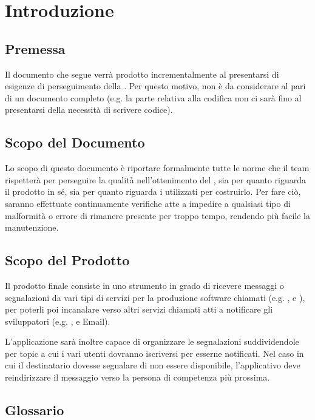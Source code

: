 \section{Introduzione}\label{Introduzione}

    \subsection{Premessa}
    Il documento che segue verrà prodotto incrementalmente al presentarsi di esigenze di perseguimento della .
    Per questo motivo, non è da considerare al pari di un documento completo (e.g. la parte relativa alla codifica non ci sarà fino
    al presentarsi della necessità di scrivere codice).

    \subsection{Scopo del Documento}
    Lo scopo di questo documento è riportare formalmente tutte le norme che il team \gruppo rispetterà per perseguire
    la qualità nell'ottenimento del , sia per quanto riguarda il prodotto in s\'e, sia per quanto riguarda i 
    utilizzati per costruirlo. Per fare ciò, saranno effettuate continuamente verifiche atte a impedire a qualsiasi tipo di malformità o errore
    di rimanere presente per troppo tempo, rendendo più facile la manutenzione.

    \subsection{Scopo del Prodotto}
    Il prodotto finale consiste in uno strumento in grado di ricevere messaggi o segnalazioni da vari tipi di servizi per la produzione software chiamati  (e.g. ,  e ), per poterli poi incanalare verso altri servizi chiamati  atti a notificare gli sviluppatori (e.g. ,  e Email).
    
    L'applicazione sarà inoltre capace di organizzare le segnalazioni suddividendole per topic a cui i vari utenti dovranno iscriversi per esserne notificati. Nel caso in cui il destinatario dovesse segnalare di non essere disponibile, l'applicativo deve reindirizzare il messaggio verso la persona di competenza più prossima. 

    \subsection{Glossario}
    


